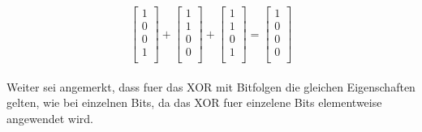 \documentclass[a4paper,10pt,ngerman]{scrartcl}
\begin{document}
$$
\begin{bmatrix}
           1 \\
           0 \\
           0 \\
           1 \\
         \end{bmatrix}
         + 
\begin{bmatrix}
           1 \\
           1 \\
           0 \\
           0 \\
         \end{bmatrix}
         + 
\begin{bmatrix}
           1 \\
           1 \\
           0 \\
           1 \\
         \end{bmatrix}
         = 
\begin{bmatrix}
           1 \\
           0 \\
           0 \\
           0 \\
         \end{bmatrix}
$$
\\Weiter sei angemerkt, dass fuer das XOR mit Bitfolgen die gleichen Eigenschaften gelten, wie bei einzelnen Bits, da das XOR fuer einzelene Bits elementweise angewendet wird.
\end{document}

